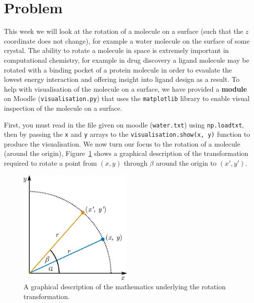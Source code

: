 \documentclass[a4paper]{article}
\begin{document}
\section{Problem}
This week we will look at the rotation of a molecule on a surface (such that the $z$ coordinate does not change), for example a water molecule on the surface of some crystal. 
The ability to rotate a molecule in space is extremely important in computational chemistry, for example in drug discovery a ligand molecule may be rotated with a binding pocket of a protein molecule in order to evaulate the lowest energy interaction and offering insight into ligand design as a result. 
To help with visualisation of the molecule on a surface, we have provided a \textbf{module} on Moodle (\texttt{visualisation.py}) that uses the \texttt{matplotlib} library to enable visual inspection of the molecule on a surface.

First, you must read in the file given on moodle (\texttt{water.txt}) using \texttt{np.loadtxt}, then by passing the \texttt{x} and \texttt{y} arrays to the \texttt{visualisation.show(x, y)} function to produce the visualisation. 
We now turn our focus to the rotation of a molecule (around the origin), Figure~\ref{fig:rotation} shows a graphical description of the transformation required to rotate a point from $(x, y)$ through $\beta$ around the origin to $(x', y')$.
%
\begin{figure}[t]
  \centering
  \includegraphics[width=0.5\textwidth]{rotation}
  \caption{\label{fig:rotation} A graphical description of the mathematics underlying the rotation transformation.}
\end{figure}
%
\end{document}
